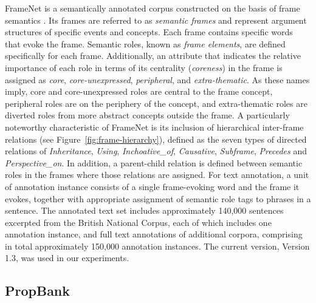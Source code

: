 \documentclass[english]{jnlp_1.4_rep}
\begin{document}
FrameNet is a semantically annotated corpus constructed on the basis of frame semantics \cite{fillmore1976}. Its frames are referred to as {\it semantic frames} and represent argument structures of specific events and concepts. Each frame contains specific words that evoke the frame. Semantic roles, known as {\it frame elements}, are defined specifically for each frame. Additionally, an attribute that indicates the relative importance of each role in terms of its centrality ({\it coreness}) in the frame is assigned as {\it core}, {\it core-unexpressed}, {\it peripheral}, and {\it extra-thematic}. As these names imply, core and core-unexpressed roles are central to the frame concept, peripheral roles are on the periphery of the concept, and extra-thematic roles are diverted roles from more abstract concepts outside the frame. A particularly noteworthy characteristic of FrameNet is its inclusion of hierarchical inter-frame relations (see Figure~\ref{fig:frame-hierarchy}), defined as the seven types of directed relations of {\it Inheritance}, {\it Using}, {\it Inchoative\_of}, {\it Causative}, {\it Subframe}, {\it Precedes} and {\it Perspective\_on}. In addition, a parent-child relation is defined between semantic roles in the frames where those relations are assigned. For text annotation, a unit of annotation instance consists of a single frame-evoking word and the frame it evokes, together with appropriate assignment of semantic role tags to phrases in a sentence. The annotated text set includes approximately 140,000 sentences excerpted from the British National Corpus, each of which includes one annotation instance, and full text annotations of additional corpora, comprising in total approximately 150,000 annotation instances.
The current version, Version 1.3, was used in our experiments.


\subsection{PropBank}
\label{sec:propbank}
\end{document}
